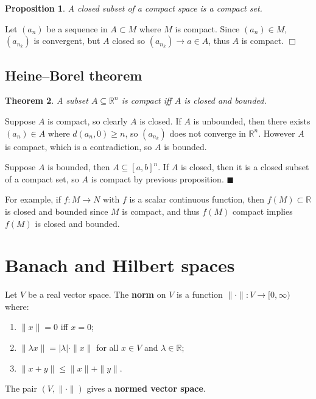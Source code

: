 \documentclass[letter-paper]{tufte-book}
\newtheorem{theorem}{\color{pastel-blue}Theorem}[section]
\newtheorem{proposition}[theorem]{\color{pastel-blue}Proposition}
\newenvironment{proof}[1][Proof]{\begin{trivlist}
\item[\hskip \labelsep {\bfseries #1}]}{\end{trivlist}}
\newcommand{\qed}{\hfill$\blacksquare$}
\newcommand{\qedwhite}{\hfill \ensuremath{\Box}}
\begin{document}
\begin{proposition}
  A closed subset of a compact space is a compact set.
\end{proposition}

\begin{proof}
  Let $(a_n)$ be a sequence in $A \subset M$ where $M$ is compact. Since $(a_n)
  \in M$, $(a_{n_k})$ is convergent, but $A$ closed so $(a_{n_k}) \to a \in A$,
  thus $A$ is compact. \qedwhite
\end{proof}

\subsection{Heine--Borel theorem}

\begin{theorem}
  A subset $A \subseteq \mathbb{R}^n$ is compact iff $A$ is closed and bounded.
\end{theorem}

\begin{proof}
  Suppose $A$ is compact, so clearly $A$ is closed. If $A$ is unbounded, then
  there exists $(a_n) \in A$ where $d(a_n, 0) \geq n$, so $(a_{n_k})$ does not
  converge in $\mathbb{R}^n$. However $A$ is compact, which is a contradiction,
  so $A$ is bounded.
  
  Suppose $A$ is bounded, then $A\subseteq [a,b]^n$. If $A$ is closed, then it
  is a closed subset of a compact set, so $A$ is compact by previous
  proposition. \qed
\end{proof}

For example, if $f: M \to N$ with $f$ is a scalar continuous function, then
$f(M) \subset \mathbb{R}$ is closed and bounded since $M$ is compact, and thus
$f(M)$ compact implies $f(M)$ is closed and bounded.


\section{Banach and Hilbert spaces}

Let $V$ be a real vector space. The \textbf{norm} on $V$ is a function
$\|\cdot\| : V \to [0, \infty)$ where:
\begin{enumerate}
  \item $\|x\| = 0$ iff $x = 0$;
  \item $\|\lambda x \| = |\lambda| \cdot \|x\|$ for all $x \in V$ and
  $\lambda \in \mathbb{R}$;
  \item $\|x + y\| \leq \|x\| + \|y\|$.
\end{enumerate}
The pair $\left(V, \| \cdot \|\right)$ gives a \textbf{normed vector space}.
\end{document}
